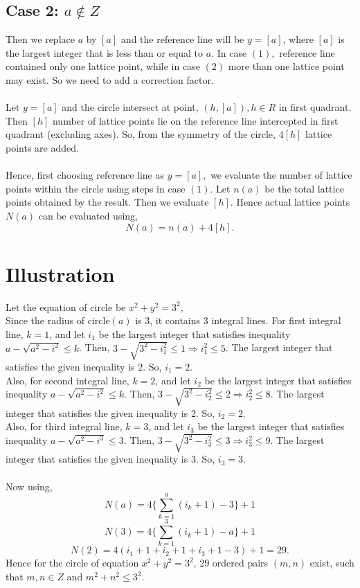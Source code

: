 \documentclass[journal,twoside]{IEEEtran}
\begin{document}
\subsection{Case 2: $a \notin Z$}
Then we replace $a$ by $[a]$ and the reference line will be $y=[a]$, where $[a]$ is the largest integer that is less than or equal to $a$. In case $(1),$ reference line contained only one lattice point, while in case $(2)$ more than one lattice point may exist. So we need to add a correction factor.
\\\\
Let $y=[a]$ and the circle intersect at point, $(h,[a]),h \in R$ in first quadrant. Then $[h]$ number of lattice points lie on the reference line intercepted in first quadrant (excluding axes). So, from the symmetry of the circle, $4[h]$ lattice points are added.
\\\\Hence, first choosing reference line as $y=[a],$ we evaluate the number of lattice points within the circle using steps in case $(1).$ Let $n(a)$ be the total lattice points obtained by the result. Then we evaluate $[h].$ Hence actual lattice points $N(a)$ can be evaluated using, $$N(a)=n(a)+4[h].$$



\section{Illustration}
Let the equation of circle be $x^{2}+y^{2}=3^{2}$,
\\Since the radius of circle$(a)$ is 3, it contains 3 integral lines. For first integral line, $k=1$, and let $i_{1}$ be the largest integer that satisfies inequality $a- \sqrt{a^{2}-i^{2}} \leq k$. Then, $3- \sqrt{3^{2}-i_{1}^{2}} \leq 1 \Rightarrow i_{1}^{2} \leq 5 $. The largest integer that satisfies the given inequality is 2. So, $i_{1}=2$.
\\Also, for second integral line, $k=2$, and let $i_{2}$ be the largest integer that satisfies inequality $a- \sqrt{a^{2}-i^{2}} \leq k$. Then, $3- \sqrt{3^{2}-i_{2}^{2}} \leq 2 \Rightarrow i_{2}^{2} \leq 8 $. The largest integer that satisfies the given inequality is 2. So, $i_{2}=2$.
\\Also, for third integral line, $k=3$, and let $i_{3}$ be the largest integer that satisfies inequality $a- \sqrt{a^{2}-i^{3}} \leq 3$. Then, $3- \sqrt{3^{2}-i_{3}^{2}} \leq 3 \Rightarrow i_{3}^{2} \leq 9 $. The largest integer that satisfies the given inequality is 3. So, $i_{3}=3$.
\\\\Now using, $$N(a)=4\bigg\{\sum_{k=1}^{a}(i_{k}+1)-3\bigg\}+1$$
$$N(3)=4\bigg\{\sum_{k=1}^{3}(i_{k}+1)-a\bigg\}+1$$
$$N(2)=4(i_{1}+1+i_{2}+1+i_{3}+1-3)+1= 29.$$
Hence for the circle of equation $x^{2}+y^{2}=3^{2}$, $29$ ordered pairs $(m,n)$ exist, such that $m,n \in Z$ and $m^{2}+n^{2} \leq 3^{2}$.
\end{document}
